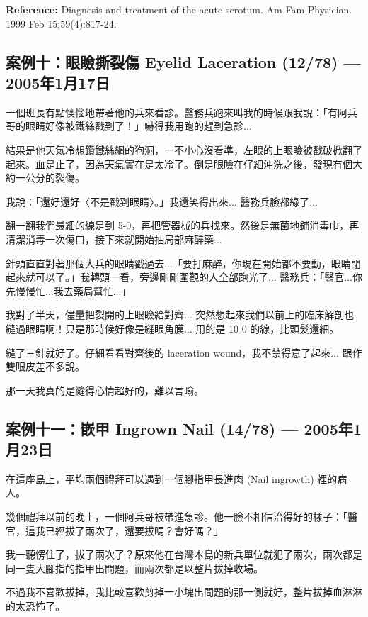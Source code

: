 \documentclass[12pt,a4paper]{article}
\newenvironment{myquote}{%
    \begin{tcolorbox}[
        colback=quote_bg,
        colframe=emergency_gray,
        boxrule=0pt,
        leftrule=3pt,
        arc=0pt,
        left=10pt,
        right=10pt,
        top=8pt,
        bottom=8pt
    ]
    \itshape
}{%
    \end{tcolorbox}
}
\begin{document}
\textbf{Reference:} Diagnosis and treatment of the acute scrotum. Am Fam Physician. 1999 Feb 15;59(4):817-24.

\subsection{案例十：眼瞼撕裂傷 Eyelid Laceration (12/78) — 2005年1月17日}

一個班長有點懊惱地帶著他的兵來看診。醫務兵跑來叫我的時候跟我說：「有阿兵哥的眼睛好像被鐵絲戳到了！」嚇得我用跑的趕到急診...

結果是他天氣冷想鑽鐵絲網的狗洞，一不小心沒看準，左眼的上眼瞼被戳破掀翻了起來。血是止了，因為天氣實在是太冷了。倒是眼瞼在仔細沖洗之後，發現有個大約一公分的裂傷。

我說：「還好還好〈不是戳到眼睛〉。」我還笑得出來... 醫務兵臉都綠了...

翻一翻我們最細的線是到 5-0，再把管器械的兵找來。然後是無菌地鋪消毒巾，再清潔消毒一次傷口，接下來就開始抽局部麻醉藥...

針頭直直對著那個大兵的眼睛戳過去...「要打麻醉，你現在開始都不要動，眼睛閉起來就可以了。」我轉頭一看，旁邊剛剛圍觀的人全部跑光了... 醫務兵：「醫官...你先慢慢忙...我去藥局幫忙...」

我對了半天，儘量把裂開的上眼瞼給對齊... 突然想起來我們以前上的臨床解剖也縫過眼睛啊！只是那時候好像是縫眼角膜... 用的是 10-0 的線，比頭髮還細。

縫了三針就好了。仔細看看對齊後的 laceration wound，我不禁得意了起來... 跟作雙眼皮差不多說。

\begin{myquote}
那一天我真的是縫得心情超好的，難以言喻。
\end{myquote}

\subsection{案例十一：嵌甲 Ingrown Nail (14/78) — 2005年1月23日}

在這座島上，平均兩個禮拜可以遇到一個腳指甲長進肉 (Nail ingrowth) 裡的病人。

幾個禮拜以前的晚上，一個阿兵哥被帶進急診。他一臉不相信治得好的樣子：「醫官，這我已經拔了兩次了，還要拔嗎？會好嗎？」

我一聽愣住了，拔了兩次了？原來他在台灣本島的新兵單位就犯了兩次，兩次都是同一隻大腳指的指甲出問題，而兩次都是以整片拔掉收場。

不過我不喜歡拔掉，我比較喜歡剪掉一小塊出問題的那一側就好，整片拔掉血淋淋的太恐怖了。
\end{document}
